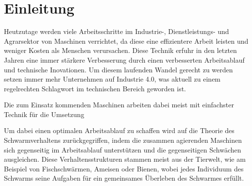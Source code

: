 \setcounter{page}{1}
\ofoot{\pagemark}

\section{Einleitung}

Heutzutage werden viele Arbeitsschritte im Industrie-, Dienstleistungs- und Agrarsektor von Maschinen verrichtet, da diese eine effizientere Arbeit leisten und weniger Kosten als Menschen verursachen. Diese Technik erfuhr in den letzten Jahren eine immer stärkere Verbesserung durch einen verbesserten Arbeitsablauf und technische Inovationen. Um diesem laufenden Wandel gerecht zu werden setzen immer mehr Unternehmen auf Industrie 4.0, was aktuell zu einem regelrechten Schlagwort im technischen Bereich geworden ist.


 Die zum Einsatz kommenden Maschinen arbeiten dabei meist mit einfachster Technik für die Umsetzung 
 
 
 Um dabei einen optimalen Arbeitsablauf zu schaffen wird auf die Theorie des Schwarmverhaltens zurückgegriffen, indem die zusammen agierenden Maschinen sich gegenseitig im Arbeitsablauf unterstützen und die gegenseitigen Schwächen ausgleichen. Diese Verhaltensstrukturen stammen meist aus der Tierwelt, wie am Beispiel von Fischschwärmen, Ameisen oder Bienen, wobei jedes Individuum des Schwarms seine Aufgaben für ein gemeinsames Überleben des Schwarmes erfüllt.\\

\begin{comment}

	\begin{itemize}
		\item Verhaltensstrukturen von Tieren
		\item Verwirklichung anhand kleinroboter
		\item Verfolgungsszenario
		\item standard methoden zum autonomen Fahren
		\item Reaktion durch Kommandos
		\item Einsatz: STauvermeidung, optimale verkehrsführung, abschleppen, ...
		\item 
	\end{itemize}

	In diesem Projekt werden die grundlegenden Verhaltensstrukturen von in Schwärmen lebenden Tieren aufgegriffen, welche für ein Verfolgungsszenario, wie am Beispiel eines autonom fahrenden Autos, benötigt werden. Diese werden anhand eines Verfolgungsszenario von verschiedenen Kleinrobotern verwirklicht, indem verschiedene gundlegende Methoden zur Aktion von robotern implementiert wird. Der roboter soll sich damit mittels auslösender Kommandos autonom agieren. DIeses Szenario kann für viele aktuelle Punkte eingesetzt werde, wie zur STauvermeidung und einer optimalen Verkehrsführung.
\end{comment}


